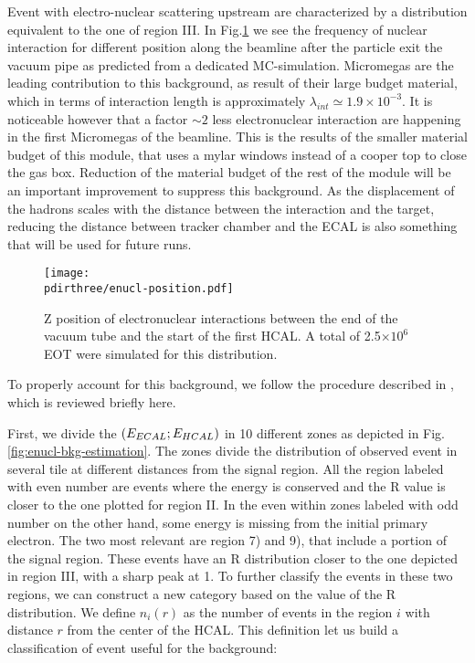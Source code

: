 Event with electro-nuclear scattering upstream are characterized by a distribution equivalent to the one of region III. In Fig.\ref{fig:enucl-position} we see the frequency of nuclear interaction for different position along the beamline after the particle exit the vacuum pipe as predicted from a dedicated MC-simulation. Micromegas are the leading contribution to this background, as result of their large budget material, which in terms of interaction length is approximately $\lambda_{int} \simeq 1.9 \times 10^{-3}$. It is noticeable however that a factor $\sim 2$ less electronuclear interaction are happening in the first Micromegas of the beamline. This is the results of the smaller material budget of this module, that uses a mylar windows instead of a cooper top to close the gas box. Reduction of the material budget of the rest of the module will be an important improvement to suppress this background. As the displacement of the hadrons scales with the distance between the interaction and the target, reducing the distance between tracker chamber and the ECAL is also something that will be used for future runs.

\begin{figure}[bth!]
  \centering
  \texttt{[image: \\pdirthree/enucl-position.pdf]}
  \caption[electronuclear interaction position]{Z position of electronuclear interactions between the end of the vacuum tube and the start of the first HCAL. A total of 2.5$\times 10^6$ EOT were simulated for this distribution.}
  \label{fig:enucl-position}
\end{figure}

To properly account for this background, we follow the procedure described in \cite{na64-neutrals-study,pdegen-thesis}, which is reviewed briefly here.


First, we divide the $(E_{ECAL};E_{HCAL})$ in 10 different zones as depicted in Fig.\ref{fig:enucl-bkg-estimation}. The zones divide the distribution of observed event in several tile at different distances from the signal region. All the region labeled with even number are events where the energy is conserved and the R value is closer to the one plotted for region II. In the even within zones labeled with odd number on the other hand, some energy is missing from the initial primary electron. The two most relevant are region 7) and 9), that include a portion of the signal region. These events have an R distribution closer to the one depicted in region III, with a sharp peak at 1. To further classify the events in these two regions, we can construct a new category based on the value of the R distribution. We define $n_i(r)$ as the number of events in the region $i$ with distance $r$ from the center of the HCAL. This definition let us build a classification of event useful for the background:

